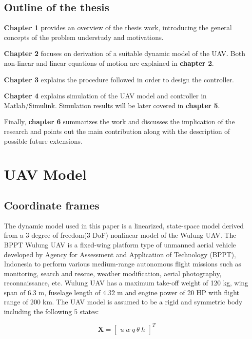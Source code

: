 \documentclass[12pt]{article}
\begin{document}
\subsection{Outline of the thesis}
\textbf{Chapter 1} provides an overview of the thesis work, introducing the general concepts of the problem understudy and motivations. 

\textbf{Chapter 2} focuses on derivation of a suitable dynamic model of the UAV. Both non-linear and linear equations of motion are explained in \textbf{chapter 2}.

\textbf{Chapter 3} explains the procedure followed in order to design the controller.

\textbf{Chapter 4} explains simulation of the UAV model and controller in Matlab/Simulink. Simulation results will be later covered in \textbf{chapter 5}.

Finally, \textbf{chapter 6} summarizes the work and discusses the implication of the research and points out the main contribution along with the description of possible future extensions.

\section{UAV Model}

\subsection{Coordinate frames}
The dynamic model used in this paper is a linearized, state-space model derived from a 3 degree-of-freedom(3-DoF) nonlinear model of the Wulung UAV. The BPPT Wulung UAV is a fixed-wing platform type of unmanned aerial vehicle developed by Agency for Assessment and Application of Technology (BPPT), 
Indonesia to perform various medium-range autonomous flight missions such as monitoring, search and rescue, weather modification, aerial photography, reconnaissance, etc. Wulung UAV has a maximum 
take-off weight of 120 kg, wing span of 6.3 m, fuselage length of 4.32 m and engine power of 20 HP with flight range of 200 km. The UAV model is assumed to be a rigid and symmetric body including the following 5 states:

\begin{equation}
    \mathbf{X} = \begin{bmatrix} u \ w \ q \ \theta  \ h\end{bmatrix}^T
\end{equation}
\end{document}
